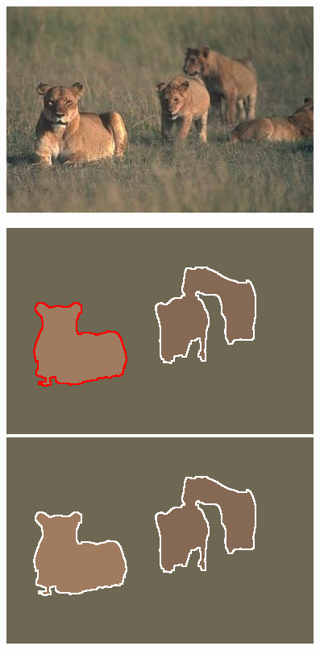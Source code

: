 \begin{figure}
\begin{center}
\begin{minipage}{0.24\linewidth}
\includegraphics[width=\linewidth]{fig/aligned_lions/cropped_image.jpg}
\end{minipage}
\begin{minipage}{0.24\linewidth}
\includegraphics[width=\linewidth]{fig/aligned_lions/mcg_underseg.png}\\[1mm]
\includegraphics[width=\linewidth]{fig/aligned_lions/mcg_our_underseg.png}

\end{minipage}
\end{center}
\end{figure}
